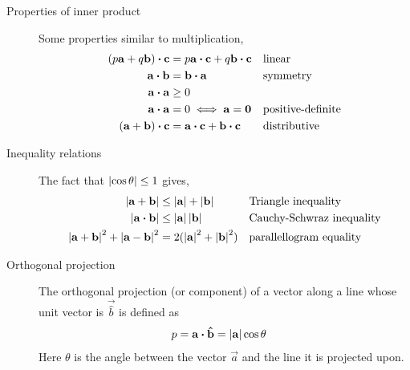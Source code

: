 \begin{description}
    \item[Properties of inner product] Some properties similar to multiplication,
        \begin{align}
            (p\mathbf{a} + q\mathbf{b}) \boldsymbol{\cdot} \mathbf{c} & = p \mathbf{a} \boldsymbol{\cdot} \mathbf{c}
            + q \mathbf{b} \boldsymbol{\cdot} \mathbf{c}           &
                                                & \text{linear}                \\
            \mathbf{a} \boldsymbol{\cdot} \mathbf{b}               & = \mathbf{b} \boldsymbol{\cdot} \mathbf{a}    &
                                                & \text{symmetry}              \\
            \mathbf{a} \boldsymbol{\cdot} \mathbf{a}               & \geq 0                       \\
            \mathbf{a} \boldsymbol{\cdot} \mathbf{a}               & = 0 \iff \mathbf{a = \mathbf{0}} &
                                                & \text{positive-definite}     \\
            (\mathbf{a} + \mathbf{b}) \boldsymbol{\cdot} \mathbf{c}   & = \mathbf{a} \boldsymbol{\cdot} \mathbf{c}
            + \mathbf{b} \boldsymbol{\cdot} \mathbf{c}             &
                                                & \text{distributive}
        \end{align}

    \item[Inequality relations] The fact that $ \left\lvert \cos\theta \right\rvert \leq 1$ gives,
        \begin{align}
            \left\lvert \mathbf{a} + \mathbf{b} \right\rvert                               &
            \leq \left\lvert \mathbf{a} \right\rvert + \left\lvert \mathbf{b} \right\rvert                    &
                                                                  &
            \text{Triangle inequality}                              \\
            \left\lvert \mathbf{a} \boldsymbol{\cdot} \mathbf{b} \right\rvert                           &
            \leq \left\lvert \mathbf{a} \right\rvert \left\lvert \mathbf{b} \right\rvert                      &
                                                                  &
            \text{Cauchy-Schwraz inequality}                        \\
            \left\lvert \mathbf{a} + \mathbf{b} \right\rvert^2 + \left\lvert \mathbf{a} - \mathbf{b} \right\rvert^2 &
            = 2 (\left\lvert \mathbf{a} \right\rvert^2 + \left\lvert \mathbf{b} \right\rvert^2)               &
                                                                  &
            \text{parallellogram equality}
        \end{align}

    \item[Orthogonal projection] The orthogonal projection (or component) of a vector
        along a line whose unit vector is $ \vec{\hat{b}} $ is defined as
        \begin{align}
            p & = \mathbf{a} \boldsymbol{\cdot} \mathbf{\hat{b}} = \left\lvert \mathbf{a} \right\rvert \cos \theta
        \end{align}
        Here $ \theta $ is the angle between the vector $ \vec{a} $ and the line it is
        projected upon. \par


\end{description}
